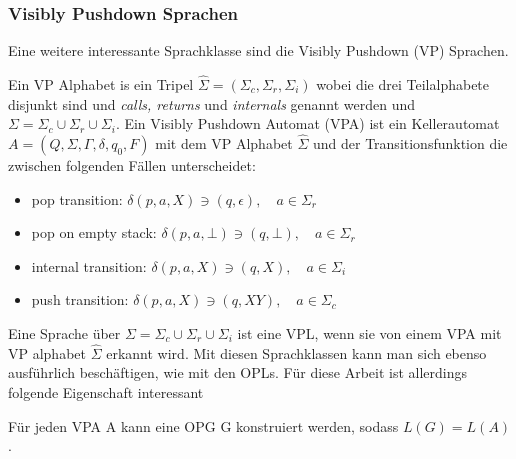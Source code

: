 \subsubsection{Visibly Pushdown Sprachen}
Eine weitere interessante Sprachklasse sind die Visibly Pushdown (VP) Sprachen. \cite{vpl}
\begin{definition}
Ein VP Alphabet is ein Tripel $\hat{\Sigma}=(\Sigma_c, \Sigma_r, \Sigma_i)$ wobei die drei Teilalphabete disjunkt sind und \textit{calls, returns} und \textit{internals} genannt werden und $\Sigma=\Sigma_c \cup \Sigma_r \cup \Sigma_i$. Ein Visibly Pushdown Automat (VPA) ist ein Kellerautomat $A=(Q, \Sigma, \Gamma, \delta, q_0, F)$ mit dem VP Alphabet $\hat{\Sigma}$ und der Transitionsfunktion die zwischen folgenden Fällen unterscheidet:
\begin{itemize}
\item
pop transition: $\delta(p,a,X) \ni (q, \epsilon), \quad a \in \Sigma_r$
\item
pop on empty stack: $\delta(p, a, \bot) \ni (q, \bot), \quad a \in \Sigma_r$
\item
internal transition: $\delta(p,a,X) \ni (q, X), \quad a \in \Sigma_i$
\item
push transition: $\delta(p, a, X) \ni (q, XY), \quad a \in \Sigma_c$
\end{itemize}
\end{definition}
Eine Sprache über $\Sigma=\Sigma_c \cup \Sigma_r \cup \Sigma_i$ ist eine VPL, wenn sie von einem VPA mit VP alphabet $\hat{\Sigma}$ erkannt wird.
Mit diesen Sprachklassen kann man sich ebenso ausführlich beschäftigen, wie mit den OPLs. Für diese Arbeit ist allerdings folgende Eigenschaft interessant\cite{op_vpl_property}
\begin{lemma}
Für jeden VPA A kann eine OPG G konstruiert werden, sodass $L(G)=L(A)$.
\end{lemma}
